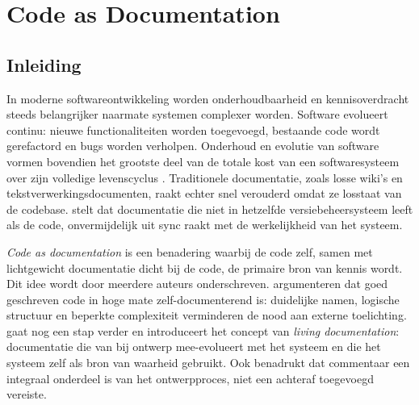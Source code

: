 %

\chapter{Code as Documentation}
\label{chap:code-as-documentation}

\section{Inleiding}
\label{sec:cad-intro}

In moderne softwareontwikkeling worden onderhoudbaarheid en kennisoverdracht steeds belangrijker naarmate systemen complexer worden. Software evolueert continu: nieuwe functionaliteiten worden toegevoegd, bestaande code wordt gerefactord en bugs worden verholpen. Onderhoud en evolutie van software vormen bovendien het grootste deel van de totale kost van een softwaresysteem over zijn volledige levenscyclus \autocite{tripathy2014softwareevolution}. Traditionele documentatie, zoals losse wiki's en tekstverwerkingsdocumenten, raakt echter snel verouderd omdat ze losstaat van de codebase. \textcite{gentle2017docslikecode} stelt dat documentatie die niet in hetzelfde versiebeheersysteem leeft als de code, onvermijdelijk uit sync raakt met de werkelijkheid van het systeem.

\textit{Code as documentation} is een benadering waarbij de code zelf, samen met lichtgewicht documentatie dicht bij de code, de primaire bron van kennis wordt. Dit idee wordt door meerdere auteurs onderschreven. \textcite{boswell2011readablecode} argumenteren dat goed geschreven code in hoge mate zelf-documenterend is: duidelijke namen, logische structuur en beperkte complexiteit verminderen de nood aan externe toelichting. \textcite{martraire2019livingdocumentation} gaat nog een stap verder en introduceert het concept van \textit{living documentation}: documentatie die van bij ontwerp mee-evolueert met het systeem en die het systeem zelf als bron van waarheid gebruikt. Ook \textcite{ousterhout2018philosophy} benadrukt dat commentaar een integraal onderdeel is van het ontwerpproces, niet een achteraf toegevoegd vereiste.

